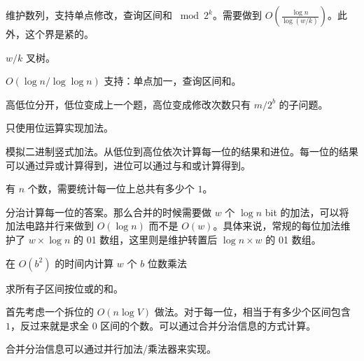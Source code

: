 \begin{example}
    维护数列，支持单点修改，查询区间和 $\bmod 2^k$。需要做到 $O(\frac{\log n}{\log (w/k)})$。此外，这个界是紧的。
\end{example}
\begin{solution}
    $w/k$ 叉树。
\end{solution}
\begin{example}
    $O(\log n/\log\log n)$ 支持：单点加一，查询区间和。
\end{example}
\begin{solution}
    高低位分开，低位变成上一个题，高位变成修改次数只有 $m/2^b$ 的子问题。
\end{solution}

\begin{example}[加法电路]
    只使用位运算实现加法。
\end{example}
\begin{solution}
    模拟二进制竖式加法。从低位到高位依次计算每一位的结果和进位。每一位的结果可以通过异或计算得到，进位可以通过与和或计算得到。
\end{solution}
\begin{example}[并行加法器]
    有 $n$ 个数，需要统计每一位上总共有多少个 $1$。
\end{example}
\begin{solution}
    分治计算每一位的答案。那么合并的时候需要做 $w$ 个 $\log n$ bit 的加法，可以将加法电路并行来做到 $O(\log n)$ 而不是 $O(w)$。具体来说，常规的每位加法维护了 $w\times \log n$ 的 01 数组，这里则是维护转置后 $\log n\times w$ 的 01 数组。
\end{solution}
\begin{exercise}[并行乘法器]
    在 $O(b^2)$ 的时间内计算 $w$ 个 $b$ 位数乘法
\end{exercise}

\begin{example}[第七学区]
    求所有子区间按位或的和。
\end{example}
\begin{solution}
    首先考虑一个拆位的 $O(n\log V)$ 做法。对于每一位，相当于有多少个区间包含 $1$，反过来就是求全 $0$ 区间的个数。可以通过合并分治信息的方式计算。

    合并分治信息可以通过并行加法/乘法器来实现。
\end{solution}

